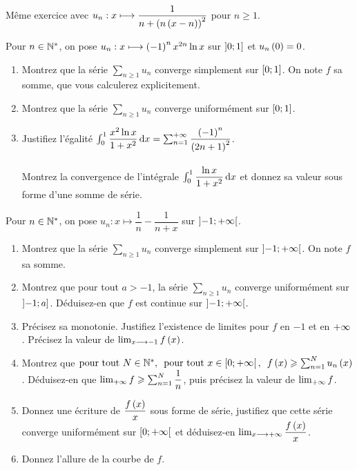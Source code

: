 \begin{exoss}
Même exercice avec \(u_n:x\longmapsto\dfrac{1}{n+\left(n\left(x-n\right)\right)^2}\) pour \(n\geq1\).
\end{exoss}

\begin{exoss}
Pour \(n\in\mathbb{N}^*\), on pose \(u_n:x\longmapsto\left(-1\right)^nx^{2n}\ln x\) sur \(\left]0;1\right]\) et \(u_n\left(0\right)=0\).

\begin{enumerate}
    \item Montrez que la série \(\sum_{n\geq1}u_n\) converge simplement sur \(\left[0;1\right]\). On note \(f\) sa somme, que vous calculerez explicitement. \\
    \item Montrez que la série \(\sum_{n\geq1}u_n\) converge uniformément sur \(\left[0;1\right]\). \\
    \item Justifiez l'égalité \(\int_0^1\dfrac{x^2\ln x}{1+x^2}\odif{x}=\sum_{n=1}^{\pinf}\dfrac{\paren{-1}^n}{\paren{2n+1}^2}\). \\\\ Montrez la convergence de l'intégrale \(\int_0^1\dfrac{\ln x}{1+x^2}\odif{x}\) et donnez sa valeur sous forme d'une somme de série.
\end{enumerate}
\end{exoss}

\begin{exoss}
Pour \(n\in\mathbb{N}^*\), on pose \(u_n:x\mapsto\dfrac{1}{n}-\dfrac{1}{n+x}\) sur \(\left]-1;+\infty\right[\).

\begin{enumerate}
    \item Montrez que la série \(\sum_{n\geq1}u_n\) converge simplement sur \(\left]-1;+\infty\right[\). On note \(f\) sa somme. \\
    \item Montrez que pour tout \(a>-1\), la série \(\sum_{n\geq1}u_n\) converge uniformément sur \(\left]-1;a\right]\). Déduisez-en que \(f\) est continue sur \(\left]-1;+\infty\right[\). \\
    \item Précisez sa monotonie. Justifiez l'existence de limites pour \(f\) en \(-1\) et en \(+\infty\). Précisez la valeur de \(\lim_{x\longrightarrow-1}f\left(x\right)\). \\
    \item Montrez que \(\quantifs{\tpt N\in\Ns;\tpt x\in\intervie{0}{\pinf}}f\paren{x}\geq\sum_{n=1}^Nu_n\paren{x}\). Déduisez-en que \(\lim_{+\infty}f\geqslant\sum_{n=1}^N\dfrac{1}{n}\), puis précisez la valeur de \(\lim_{+\infty}f\). \\
    \item Donnez une écriture de \(\dfrac{f\left(x\right)}{x}\) sous forme de série, justifiez que cette série converge uniformément sur \(\left[0;+\infty\right[\) et déduisez-en \(\lim_{x\longrightarrow+\infty}\dfrac{f\left(x\right)}{x}\). \\
    \item Donnez l'allure de la courbe de \(f\).
\end{enumerate}
\end{exoss}

